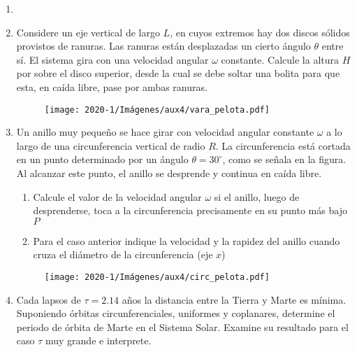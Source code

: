\documentclass[letterpaper,11pt]{article}
\begin{document}
\vspace{-1cm}
\begin{enumerate}\setlength{\itemsep}{0.4cm}


\item[]

\item Considere un eje vertical de largo $L$, en cuyos extremos hay dos discos sólidos provistos de ranuras. Las ranuras están desplazadas un cierto ángulo $\theta$ entre sí. El sistema gira con una velocidad angular $\omega$ constante. Calcule la altura $H$ por sobre el disco superior, desde la cual se debe soltar una bolita para que esta, en caída libre, pase por ambas ranuras.

\begin{figure}[h!]
    \centering
    \texttt{[image: 2020-1/Imágenes/aux4/vara\_pelota.pdf]}
\end{figure}

\item Un anillo muy pequeño se hace girar con velocidad angular constante $\omega$ a lo largo de una circunferencia vertical de radio $R$. La circunferencia está cortada en un punto determinado por un ángulo $\theta = 30^{\circ}$, como se señala en la figura. Al alcanzar este punto, el anillo se desprende y continua en caída libre.
    \begin{enumerate}
        \item Calcule el valor de la velocidad angular $\omega$ si el anillo, luego de desprenderse, toca a la circunferencia precisamente en su punto más bajo $P$
    
        \item Para el caso anterior indique la velocidad y la rapidez del anillo cuando cruza el diámetro de la circunferencia (eje $x$)
    \end{enumerate}
\begin{figure}[h!]
    \centering
    \texttt{[image: 2020-1/Imágenes/aux4/circ\_pelota.pdf]}
\end{figure}

\item Cada lapsos de $\tau = 2.14 $ años  la distancia entre la Tierra y Marte es mínima. Suponiendo órbitas circunferenciales, uniformes y coplanares, determine el periodo de órbita de Marte en el Sistema Solar. Examine su resultado para el caso $\tau$ muy grande e interprete.

\end{enumerate}
\end{document}
